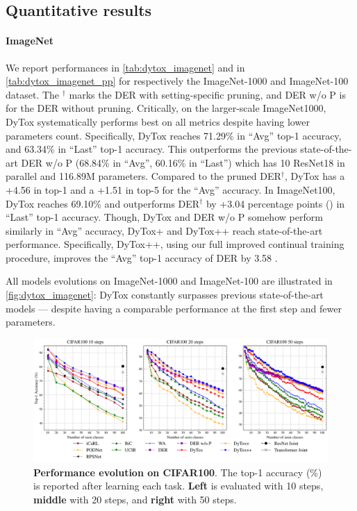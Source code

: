 \subsection{Quantitative results}

\paragraph{ImageNet}
We report performances in \autoref{tab:dytox_imagenet} and in \autoref{tab:dytox_imagenet_pp} for
respectively the ImageNet-1000 and ImageNet-100 dataset. The $^\dagger$
marks the DER with setting-specific pruning, and DER w/o P is for the DER without pruning.
Critically, on the larger-scale ImageNet1000, DyTox systematically performs best on all
metrics despite having lower parameters count. Specifically, DyTox reaches 71.29\% in ``Avg'' top-1
accuracy, and 63.34\% in ``Last'' top-1 accuracy. This outperforms the previous state-of-the-art DER
w/o P (68.84\% in ``Avg'', 60.16\% in ``Last'') which has 10 ResNet18 in parallel and 116.89M
parameters. Compared to the pruned DER$^\dagger$, DyTox has a +4.56 \pp in top-1 and a +1.51 \pp in
top-5 for the ``Avg'' accuracy. In ImageNet100, DyTox reaches 69.10\% and outperforms DER$^\dagger$ by +3.04 percentage points (\pp) in
``Last'' top-1 accuracy. Though, DyTox and DER w/o P somehow perform similarly in ``Avg'' accuracy,
DyTox+ and DyTox++ reach state-of-the-art performance. Specifically, DyTox++, using our full
improved continual training procedure, improves the ``Avg'' top-1 accuracy of DER by 3.58 \pp.

All models evolutions on ImageNet-1000 and ImageNet-100 are illustrated in
\autoref{fig:dytox_imagenet}: DyTox constantly surpasses previous state-of-the-art models --- despite
having a comparable performance at the first step and fewer parameters.



\begin{figure}[t!]
    \centering
    \includegraphics[width=1.0\linewidth]{images/dytox/cifar.png}
    \caption{\textbf{Performance evolution on CIFAR100}. The top-1 accuracy (\%) is reported after
        learning each task. \textbf{Left} is evaluated with 10 steps, \textbf{middle} with 20 steps, and
        \textbf{right} with 50 steps.}
    \label{fig:dytox_increment_cifar}
\end{figure}

